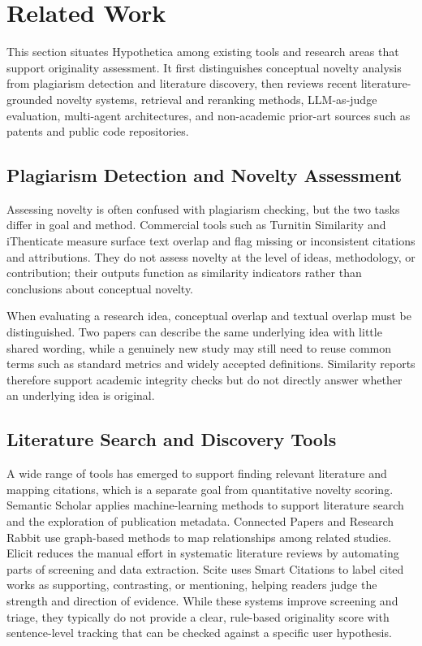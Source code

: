 \section{Related Work}
\label{sec:related_work}

This section situates Hypothetica among existing tools and research areas that support originality assessment. It first distinguishes conceptual novelty analysis from plagiarism detection and literature discovery, then reviews recent literature-grounded novelty systems, retrieval and reranking methods, LLM-as-judge evaluation, multi-agent architectures, and non-academic prior-art sources such as patents and public code repositories.

\subsection{Plagiarism Detection and Novelty Assessment}

Assessing novelty is often confused with plagiarism checking, but the two tasks differ in goal and method. Commercial tools such as Turnitin Similarity \citep{turnitin} and iThenticate \citep{ithenticate} measure surface text overlap and flag missing or inconsistent citations and attributions. They do not assess novelty at the level of ideas, methodology, or contribution; their outputs function as similarity indicators rather than conclusions about conceptual novelty.

When evaluating a research idea, conceptual overlap and textual overlap must be distinguished. Two papers can describe the same underlying idea with little shared wording, while a genuinely new study may still need to reuse common terms such as standard metrics and widely accepted definitions. Similarity reports therefore support academic integrity checks but do not directly answer whether an underlying idea is original.

\subsection{Literature Search and Discovery Tools}

A wide range of tools has emerged to support finding relevant literature and mapping citations, which is a separate goal from quantitative novelty scoring. Semantic Scholar \citep{semanticScholar} applies machine-learning methods to support literature search and the exploration of publication metadata. Connected Papers \citep{connectedPapers} and Research Rabbit \citep{researchRabbit} use graph-based methods to map relationships among related studies. Elicit \citep{elicit} reduces the manual effort in systematic literature reviews by automating parts of screening and data extraction. Scite \citep{scite} uses Smart Citations to label cited works as supporting, contrasting, or mentioning, helping readers judge the strength and direction of evidence. While these systems improve screening and triage, they typically do not provide a clear, rule-based originality score with sentence-level tracking that can be checked against a specific user hypothesis.

